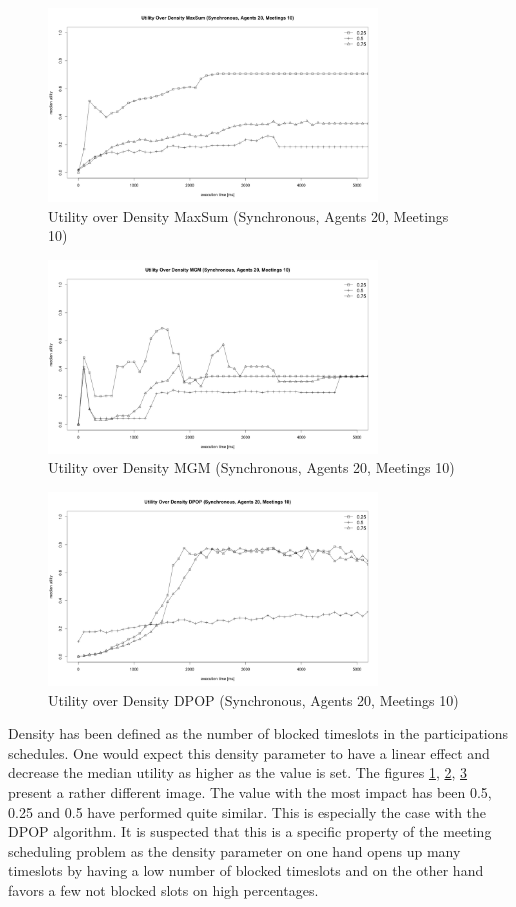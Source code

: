 \begin{figure}[H]
\centering
\includegraphics[width=330px]{graphics/experiments/static/st_5}
\caption{Utility over Density MaxSum (Synchronous, Agents 20, Meetings 10)}
\label{fig:st_5}
\end{figure}
\begin{figure}[H]
\centering
\includegraphics[width=330px]{graphics/experiments/static/st_6}
\caption{Utility over Density MGM (Synchronous, Agents 20, Meetings 10)}
\label{fig:st_6}
\end{figure}
\begin{figure}[H]
\centering
\includegraphics[width=330px]{graphics/experiments/static/st_7}
\caption{Utility over Density DPOP (Synchronous, Agents 20, Meetings 10)}
\label{fig:st_7}
\end{figure}

Density has been defined as the number of blocked timeslots in the participations schedules. One would expect this density parameter to have a linear effect and decrease the median utility as higher as the value is set. The figures \ref{fig:st_5}, \ref{fig:st_6}, \ref{fig:st_7}  present a rather different image. The value with the most impact has been 0.5, 0.25 and 0.5 have performed quite similar. This is especially the case with the DPOP algorithm. It is suspected that this is a specific property of the meeting scheduling problem as the density parameter on one hand opens up many timeslots by having a low number of blocked timeslots and on the other hand favors a few not blocked slots on high percentages.

